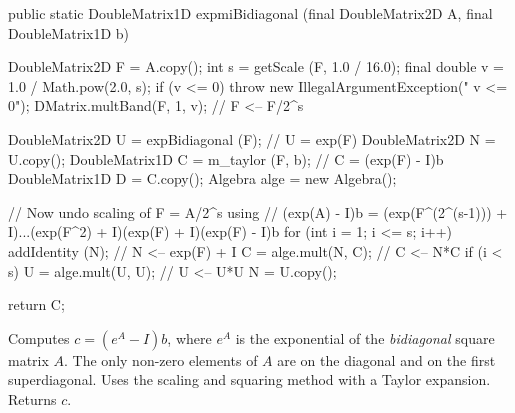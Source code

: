 \begin{code}

   public static DoubleMatrix1D expmiBidiagonal (final DoubleMatrix2D A,
                                                 final DoubleMatrix1D b) \begin{hide} {
      DoubleMatrix2D F = A.copy();
      int s = getScale (F, 1.0 / 16.0);
      final double v = 1.0 / Math.pow(2.0, s);
      if (v <= 0)
         throw new IllegalArgumentException("   v <= 0");
      DMatrix.multBand(F, 1, v);   // F <-- F/2^s

      DoubleMatrix2D U = expBidiagonal (F);   // U = exp(F)
      DoubleMatrix2D N = U.copy();
      DoubleMatrix1D C = m_taylor (F, b);   // C = (exp(F) - I)b
      DoubleMatrix1D D = C.copy();
      Algebra alge = new Algebra();

      // Now undo scaling of F = A/2^s using
      //   (exp(A) - I)b = (exp(F^(2^(s-1))) + I)...(exp(F^2) + I)(exp(F) + I)(exp(F) - I)b
      for (int i = 1; i <= s; i++) {
         addIdentity (N);        // N <-- exp(F) + I
         C = alge.mult(N, C);    // C <-- N*C
         if (i < s) {
            U = alge.mult(U, U);    // U <-- U*U
            N = U.copy();
         }
      }

      return C;
   }\end{hide}
\end{code}
\begin{tabb} Computes $c = (e^A - I)b$, where $e^A$ is the exponential of the
 \emph{bidiagonal} square matrix $A$.
 The only non-zero elements of $A$ are on the diagonal and
 on the first superdiagonal. Uses the scaling and squaring method
 \cite{mSKA09a,mHIG09a} with a Taylor expansion. Returns $c$.
\end{tabb}
\begin{htmlonly}
\end{htmlonly}


